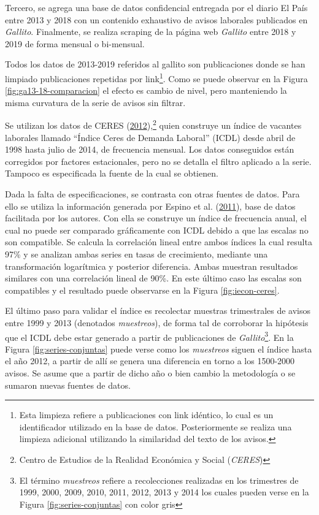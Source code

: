 \documentclass[12pt,oneside]{reedthesis}
\begin{document}
Tercero, se agrega una base de datos confidencial entregada por el diario El País entre 2013 y 2018 con un contenido exhaustivo de avisos laborales publicados en \emph{Gallito}. Finalmente, se realiza scraping de la página web \emph{Gallito} entre 2018 y 2019 de forma mensual o bi-mensual.

Todos los datos de 2013-2019 referidos al gallito son publicaciones donde se han limpiado publicaciones repetidas por link\footnote{Esta limpieza refiere a publicaciones con link idéntico, lo cual es un identificador utilizado en la base de datos. Posteriormente se realiza una limpieza adicional utilizando la similaridad del texto de los avisos.}. Como se puede observar en la Figura \ref{fig:ga13-18-comparacion} el efecto es cambio de nivel, pero manteniendo la misma curvatura de la serie de avisos sin filtrar.

Se utilizan los datos de CERES (\protect\hyperlink{ref-Ceres2012}{2012}),\footnote{Centro de Estudios de la Realidad Económica y Social (\emph{CERES})} quien construye un índice de vacantes laborales llamado ``Índice Ceres de Demanda Laboral'' (ICDL) desde abril de 1998 hasta julio de 2014, de frecuencia mensual. Los datos conseguidos están corregidos por factores estacionales, pero no se detalla el filtro aplicado a la serie. Tampoco es especificada la fuente de la cual se obtienen.

Dada la falta de especificaciones, se contrasta con otras fuentes de datos. Para ello se utiliza la información generada por Espino et al. (\protect\hyperlink{ref-Alma2011}{2011}), base de datos facilitada por los autores. Con ella se construye un índice de frecuencia anual, el cual no puede ser comparado gráficamente con ICDL debido a que las escalas no son compatible. Se calcula la correlación lineal entre ambos índices la cual resulta 97\% y se analizan ambas series en tasas de crecimiento, mediante una transformación logarítmica y posterior diferencia. Ambas muestran resultados similares con una correlación lineal de 90\%. En este último caso las escalas son compatibles y el resultado puede observarse en la Figura \ref{fig:iecon-ceres}.

El último paso para validar el índice es recolectar muestras trimestrales de avisos entre 1999 y 2013 (denotados \emph{muestreos}), de forma tal de corroborar la hipótesis que el ICDL debe estar generado a partir de publicaciones de \emph{Gallito}\footnote{El término \emph{muestreos} refiere a recolecciones realizadas en los trimestres de 1999, 2000, 2009, 2010, 2011, 2012, 2013 y 2014 los cuales pueden verse en la Figura \ref{fig:series-conjuntas} con color gris}. En la Figura \ref{fig:series-conjuntas} puede verse como los \emph{muestreos} siguen el índice hasta el año 2012, a partir de allí se genera una diferencia en torno a los 1500-2000 avisos. Se asume que a partir de dicho año o bien cambio la metodología o se sumaron nuevas fuentes de datos.
\end{document}
